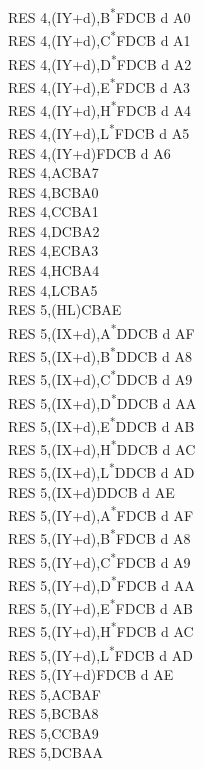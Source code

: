 \documentclass[oneside,a4paper]{book}
\begin{document}
\begin{multicols}{3}
{\begin{tabbing}
RES 4,(IY+d),B\textsuperscript{*}\>FDCB d A0\\
RES 4,(IY+d),C\textsuperscript{*}\>FDCB d A1\\
RES 4,(IY+d),D\textsuperscript{*}\>FDCB d A2\\
RES 4,(IY+d),E\textsuperscript{*}\>FDCB d A3\\
RES 4,(IY+d),H\textsuperscript{*}\>FDCB d A4\\
RES 4,(IY+d),L\textsuperscript{*}\>FDCB d A5\\
RES 4,(IY+d)\>FDCB d A6\\
RES 4,A\>CBA7\\
RES 4,B\>CBA0\\
RES 4,C\>CBA1\\
RES 4,D\>CBA2\\
RES 4,E\>CBA3\\
RES 4,H\>CBA4\\
RES 4,L\>CBA5\\
RES 5,(HL)\>CBAE\\
RES 5,(IX+d),A\textsuperscript{*}\>DDCB d AF\\
RES 5,(IX+d),B\textsuperscript{*}\>DDCB d A8\\
RES 5,(IX+d),C\textsuperscript{*}\>DDCB d A9\\
RES 5,(IX+d),D\textsuperscript{*}\>DDCB d AA\\
RES 5,(IX+d),E\textsuperscript{*}\>DDCB d AB\\
RES 5,(IX+d),H\textsuperscript{*}\>DDCB d AC\\
RES 5,(IX+d),L\textsuperscript{*}\>DDCB d AD\\
RES 5,(IX+d)\>DDCB d AE\\
RES 5,(IY+d),A\textsuperscript{*}\>FDCB d AF\\
RES 5,(IY+d),B\textsuperscript{*}\>FDCB d A8\\
RES 5,(IY+d),C\textsuperscript{*}\>FDCB d A9\\
RES 5,(IY+d),D\textsuperscript{*}\>FDCB d AA\\
RES 5,(IY+d),E\textsuperscript{*}\>FDCB d AB\\
RES 5,(IY+d),H\textsuperscript{*}\>FDCB d AC\\
RES 5,(IY+d),L\textsuperscript{*}\>FDCB d AD\\
RES 5,(IY+d)\>FDCB d AE\\
RES 5,A\>CBAF\\
RES 5,B\>CBA8\\
RES 5,C\>CBA9\\
RES 5,D\>CBAA\\

\end{tabbing}}
\end{multicols}
\end{document}
